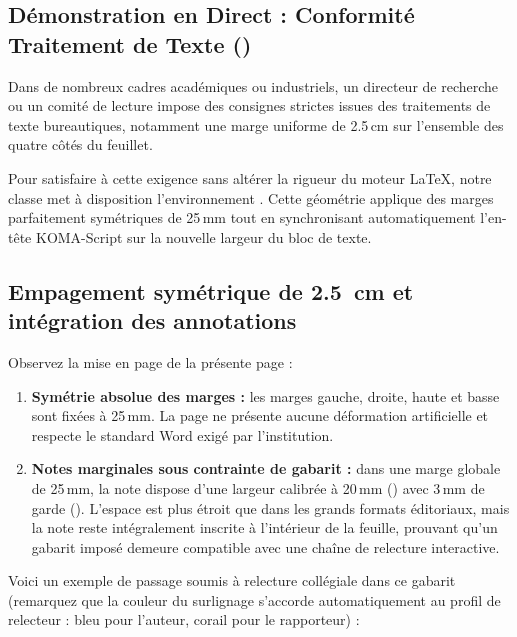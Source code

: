 \begin{WordGeometry}

\section{Démonstration en Direct : Conformité Traitement de Texte ()}
\label{sec:demo-geometrie-word}

Dans de nombreux cadres académiques ou industriels, un directeur de recherche ou un comité de lecture
impose des consignes strictes issues des traitements de texte bureautiques,
notamment une marge uniforme de 2.5\,cm sur l'ensemble des quatre côtés du feuillet.

Pour satisfaire à cette exigence sans altérer la rigueur du moteur \LaTeX{},
notre classe met à disposition l'environnement .
Cette géométrie applique des marges parfaitement symétriques de 25\,mm tout en synchronisant automatiquement l'en-tête KOMA-Script sur la nouvelle largeur du bloc de texte.

\subsection{Empagement symétrique de 2.5~cm et intégration des annotations}
Observez la mise en page de la présente page :
\begin{enumerate}
  \item \textbf{Symétrie absolue des marges :}
  les marges gauche, droite, haute et basse sont fixées à 25\,mm.
  La page ne présente aucune déformation artificielle et respecte le standard Word exigé par l'institution.
  \item \textbf{Notes marginales sous contrainte de gabarit :}
  dans une marge globale de 25\,mm, la note dispose d'une largeur calibrée à 20\,mm ()
  avec 3\,mm de garde ().
  L'espace est plus étroit que dans les grands formats éditoriaux,
  mais la note reste intégralement inscrite à l'intérieur de la feuille,
  prouvant qu'un gabarit imposé demeure compatible avec une chaîne de relecture interactive.
\end{enumerate}

Voici un exemple de passage soumis à relecture collégiale dans ce gabarit (remarquez que la couleur du surlignage s'accorde automatiquement au profil de relecteur : bleu pour l'auteur, corail pour le rapporteur) :


\end{WordGeometry}
